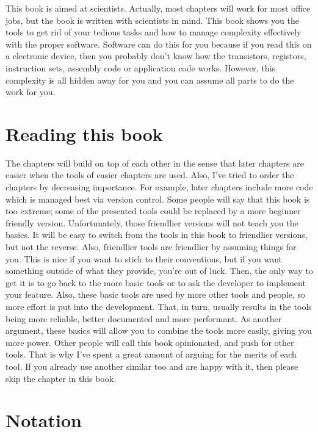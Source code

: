 \documentclass[
  14pt
  american,
  paper=a4,
  ,captions=tableheading
]{scrbook}
\begin{document}
This book is aimed at scientists. Actually, most chapters will work for
most office jobs, but the book is written with scientists in mind. This
book shows you the tools to get rid of your tedious tasks and how to
manage complexity effectively with the proper software. Software can do
this for you because if you read this on a electronic device, then you
probably don't know how the transistors, registors, instruction sets,
assembly code or application code works. However, this complexity is all
hidden away for you and you can assume all parts to do the work for you.

\hypertarget{reading-this-book}{%
\section{Reading this book}\label{reading-this-book}}

The chapters will build on top of each other in the sense that later
chapters are easier when the tools of easier chapters are used. Also,
I've tried to order the chapters by decreasing importance. For example,
later chapters include more code which is managed best via version
control. Some people will say that this book is too extreme; some of the
presented tools could be replaced by a more beginner friendly version.
Unfortunately, those friendlier versions will not teach you the basics.
It will be easy to switch from the tools in this book to friendlier
versions, but not the reverse. Also, friendlier tools are friendlier by
assuming things for you. This is nice if you want to stick to their
conventions, but if you want something outside of what they provide,
you're out of luck. Then, the only way to get it is to go back to the
more basic tools or to ask the developer to implement your feature.
Also, these basic tools are used by more other tools and people, so more
effort is put into the development. That, in turn, usually results in
the tools being more reliable, better documented and more performant. As
another argument, these basics will allow you to combine the tools more
easily, giving you more power. Other people will call this book
opinionated, and push for other tools. That is why I've spent a great
amount of arguing for the merits of each tool. If you already use
another similar too and are happy with it, then please skip the chapter
in this book.

\hypertarget{sec:notation}{%
\section{Notation}\label{sec:notation}}
\end{document}
